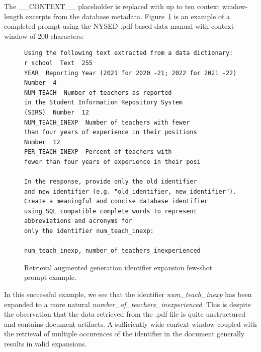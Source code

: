 The \_\_CONTEXT\_\_ placeholder is replaced with up to ten context window-length excerpts from the database metadata.
Figure~\ref{fig:ragfsprompt} is an example of a completed prompt using the NYSED .pdf based data manual with context window of 200 characters:

\begin{figure}
\begin{Verbatim}[frame=single,fillcolor=\color{lightgray}]
Using the following text extracted from a data dictionary:
r school  Text  255
YEAR  Reporting Year (2021 for 2020 -21; 2022 for 2021 -22) 
Number  4
NUM_TEACH  Number of teachers as reported 
in the Student Information Repository System
(SIRS)  Number  12
NUM_TEACH_INEXP  Number of teachers with fewer 
than four years of experience in their positions  
Number  12
PER_TEACH_INEXP  Percent of teachers with 
fewer than four years of experience in their posi

In the response, provide only the old identifier 
and new identifier (e.g. "old_identifier, new_identifier").
Create a meaningful and concise database identifier 
using SQL compatible complete words to represent 
abbreviations and acronyms for 
only the identifier num_teach_inexp:

num_teach_inexp, number_of_teachers_inexperienced
\end{Verbatim}
\caption{Retrieval augmented generation identifier expansion few-shot prompt example.}
\label{fig:ragfsprompt}
\end{figure}

In this successful example, we see that the identifier \emph{num\_teach\_inexp} has been expanded to a more natural \emph{number\_of\_teachers\_inexperienced}.
This is despite the observation that the data retrieved from the .pdf file is quite unstructured and contains document artifacts.
A sufficiently wide context window coupled with the retrieval of multiple occurences of the identifier in the document generally results in valid expansions.


